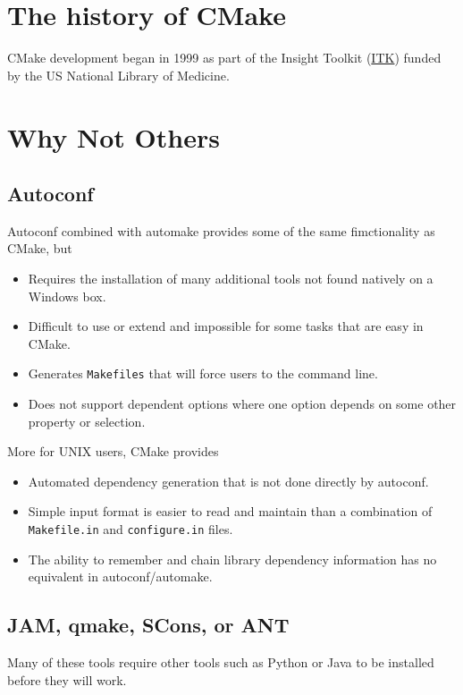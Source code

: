 \section{The history of CMake}
  CMake development began in 1999 as part of the Insight Toolkit (\href{https://itk.org/}{ITK}) funded by the US National Library of Medicine. 
\section{Why Not Others}
\subsection{Autoconf}	
	Autoconf combined with automake provides some of the same fimctionality as CMake, but 
  \begin{itemize}  
    \item Requires the installation of many additional tools not found natively on a Windows box. 
    \item Difficult to use or extend and impossible for some tasks that are easy in CMake. 
    \item Generates \texttt{Makefiles} that will force users to the command line.
    \item Does not support dependent options where one option depends on some other property or selection.
  \end{itemize}  
  More for UNIX users, CMake provides
  \begin{itemize}  
    \item Automated dependency generation that is not done directly by autoconf.
    \item Simple input format is easier to read and maintain than a combination of \texttt{Makefile.in} and \texttt{configure.in} files. 
    \item The ability to remember and chain library dependency information has no equivalent in autoconf/automake.
  \end{itemize}  
\subsection{JAM, qmake, SCons, or ANT}
   Many of these tools require other tools such as Python or Java to be installed before they will work.
